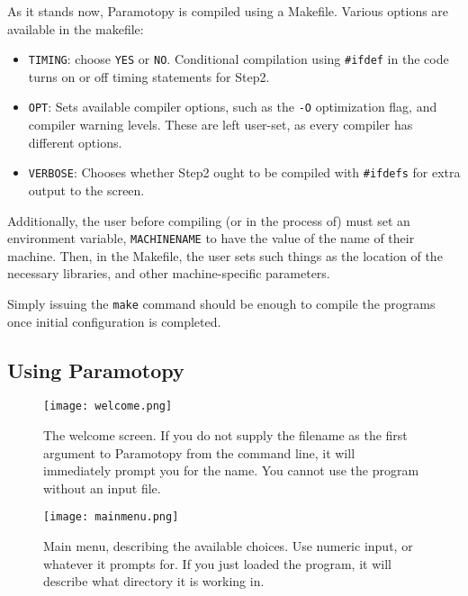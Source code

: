 As it stands now, Paramotopy is compiled using a Makefile.  Various options are available in the makefile:
\begin{itemize}
\item \texttt{TIMING}: choose {\texttt{YES}} or {\texttt{NO}}.  Conditional compilation using \texttt{\#ifdef} in the code turns on or off timing statements for Step2.
\item \texttt{OPT}: Sets available compiler options, such as the \texttt{-O} optimization flag, and compiler warning levels.  These are left user-set, as every compiler has different options.
\item \texttt{VERBOSE}:  Chooses whether Step2 ought to be compiled with \texttt{\#ifdefs} for extra output to the screen.
\end{itemize}
Additionally, the user before compiling (or in the process of) must set an environment variable, \texttt{MACHINENAME} to have the value of the name of their machine.  Then, in the Makefile, the user sets such things as the location of the necessary libraries, and other machine-specific parameters.  

Simply issuing the \texttt{make} command should be enough to compile the programs once initial configuration is completed.


\clearpage
\subsection{Using Paramotopy}
\label{sec:running}

\begin{figure}[h]
\begin{center}
\texttt{[image: welcome.png]}
\caption[Welcome Screen]{The welcome screen.  If you do not supply the filename as the first argument to Paramotopy from the command line, it will immediately prompt you for the name.  You cannot use the program without an input file.}
\label{screen:welcome}
\end{center}
\end{figure}



\begin{figure}[h]
\begin{center}
\texttt{[image: mainmenu.png]}
\caption[Main Menu]{Main menu, describing the available choices.  Use numeric input, or whatever it prompts for. If you just loaded the program, it will describe what directory it is working in.}
\label{screen:mainmenu}
\end{center}
\end{figure}



